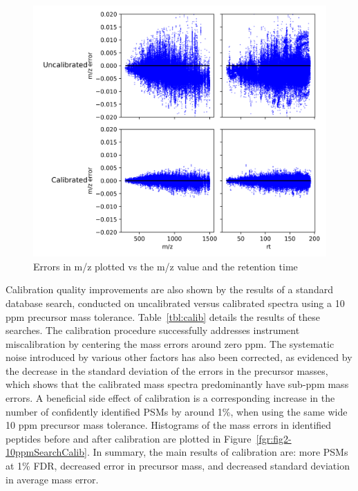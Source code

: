 \documentclass[journal=jprobs,manuscript=article]{achemso}
\begin{document}
\begin{figure}[H]
 \includegraphics{fig1-calibErrors.png}
 \caption{Errors in m/z plotted vs the m/z value and the retention time}
 \label{fgr:fig1-calibErrors}
\end{figure}

Calibration quality improvements are also shown by the results of a standard database search, conducted on uncalibrated versus calibrated spectra using a 10 ppm precursor mass tolerance.
Table~\ref{tbl:calib} details the results of these searches.
The calibration procedure successfully addresses instrument miscalibration by centering the mass errors around zero ppm.
The systematic noise introduced by various other factors has also been corrected, as evidenced by the decrease in the standard deviation of the errors in the precursor masses, which shows that the calibrated mass spectra predominantly have sub-ppm mass errors.
A beneficial side effect of calibration is a corresponding increase in the number of confidently identified PSMs by around 1\%, when using the same wide 10 ppm precursor mass tolerance.
Histograms of the mass errors in identified peptides before and after calibration are plotted in Figure~\ref{fgr:fig2-10ppmSearchCalib}.
In summary, the main results of calibration are: more PSMs at 1\% FDR, decreased error in precursor mass, and decreased standard deviation in average mass error.
\end{document}
